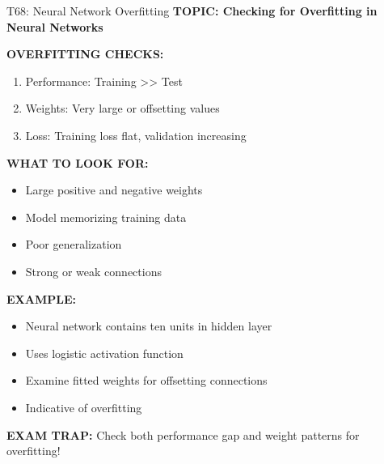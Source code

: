 \documentclass[8pt]{beamer}
\begin{document}
	\begin{frame}{T68: Neural Network Overfitting}
		\fontsize{6.5}{7.5}\selectfont
		\textbf{TOPIC: Checking for Overfitting in Neural Networks}
		
		\vspace{0.1cm}
		\textbf{OVERFITTING CHECKS:}
		\begin{enumerate}
			\item \textcolor{myblue}{Performance:} Training >> Test
			\item \textcolor{myblue}{Weights:} Very large or offsetting values
			\item \textcolor{myblue}{Loss:} Training loss flat, validation increasing
		\end{enumerate}
		
		\vspace{0.1cm}
		\textbf{WHAT TO LOOK FOR:}
		\begin{itemize}
			\item Large positive and negative weights
			\item Model memorizing training data
			\item Poor generalization
			\item Strong or weak connections
		\end{itemize}
		
		\vspace{0.1cm}
		\textbf{EXAMPLE:}
		\begin{itemize}
			\item Neural network contains ten units in hidden layer
			\item Uses logistic activation function
			\item Examine fitted weights for offsetting connections
			\item Indicative of overfitting
		\end{itemize}
		
		\textcolor{myred}{\textbf{EXAM TRAP:}} Check \textcolor{myblue}{both performance gap and weight patterns} for overfitting!
	\end{frame}
	
\end{document}
